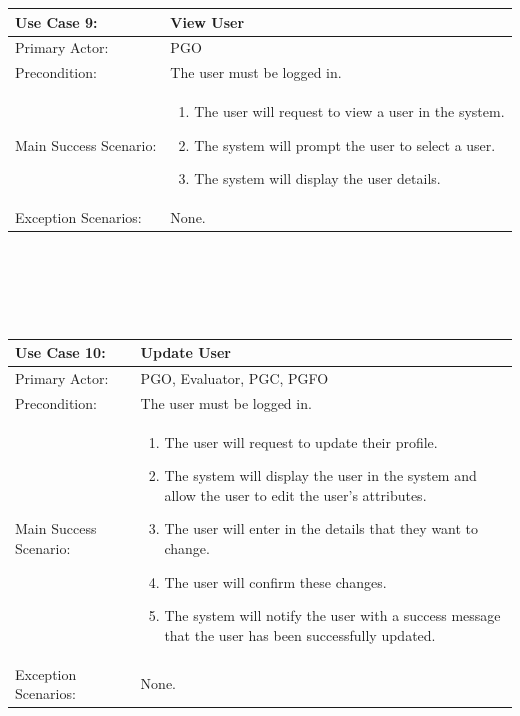 \documentclass{article}
\begin{document}
\begin{tabular}{| m{5cm} | m{10cm} |}
\hline
Use Case 9: & View User \\
\hline
Primary Actor: & PGO \\
\hline
Precondition: & The user must be logged in. \\
\hline
Main Success Scenario: & \begin{enumerate} \itemsep0em \item The user will request to view a user in the system. 
\item The system will prompt the user to select a user.
\item The system will display the user details.
\end{enumerate} \\
\hline
Exception Scenarios: & None. \\
\hline
\end{tabular}
\\ \\ \\ \\
\begin{tabular}{| m{5cm} | m{10cm} |}
\hline
Use Case 10: & Update User \\
\hline
Primary Actor: & PGO, Evaluator, PGC, PGFO \\
\hline
Precondition: & The user must be logged in. \\
\hline
Main Success Scenario: & \begin{enumerate} \itemsep0em \item The user will request to update their profile. 
\item The system will display the user in the system and allow the user to edit the user’s attributes.
\item The user will enter in the details that they want to change.
\item The user will confirm these changes.
\item The system will notify the user with a success message that the user has been successfully updated.
\end{enumerate} \\
\hline
Exception Scenarios: & None. \\
\hline
\end{tabular}
\\ \\ \\ \\
\end{document}
